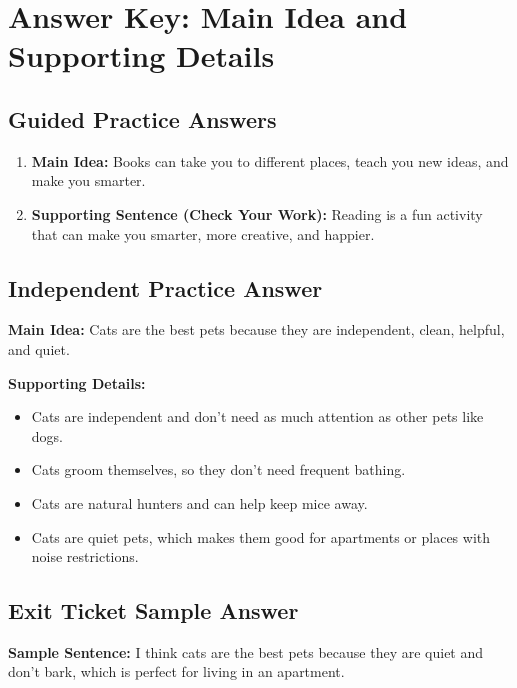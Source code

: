 \documentclass[12pt]{article}
\begin{document}
\section*{Answer Key: Main Idea and Supporting Details}

\subsection*{Guided Practice Answers}

\begin{enumerate}[itemsep=1em]
    \item \textbf{Main Idea:} Books can take you to different places, teach you new ideas, and make you smarter. 
    \item \textbf{Supporting Sentence (Check Your Work):} Reading is a fun activity that can make you smarter, more creative, and happier.
\end{enumerate}

\subsection*{Independent Practice Answer}

\textbf{Main Idea:} Cats are the best pets because they are independent, clean, helpful, and quiet.

\textbf{Supporting Details:}
\begin{itemize}
    \item Cats are independent and don’t need as much attention as other pets like dogs.
    \item Cats groom themselves, so they don’t need frequent bathing.
    \item Cats are natural hunters and can help keep mice away.
    \item Cats are quiet pets, which makes them good for apartments or places with noise restrictions.
\end{itemize}

\subsection*{Exit Ticket Sample Answer}

\textbf{Sample Sentence:} I think cats are the best pets because they are quiet and don’t bark, which is perfect for living in an apartment.
\end{document}
